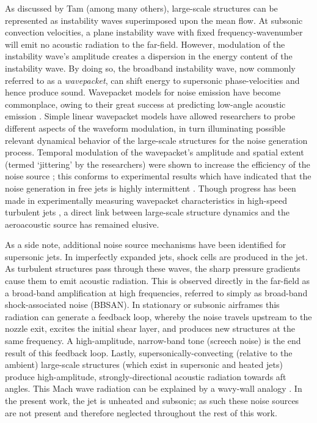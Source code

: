 As discussed by Tam \etal \citep{Tam1995} (among many others), large-scale structures can be represented as instability waves superimposed upon the mean flow.
At subsonic convection velocities, a plane instability wave with fixed frequency-wavenumber will emit no acoustic radiation to the far-field.
However, modulation of the instability wave's amplitude creates a dispersion in the energy content of the instability wave.
By doing so, the broadband instability wave, now commonly referred to as a \emph{wavepacket}, can shift energy to supersonic phase-velocities and hence produce sound.
Wavepacket models for noise emission have become commonplace, owing to their great success at predicting low-angle acoustic emission \citep{Obrist2011}.
Simple linear wavepacket models have allowed researchers to probe different aspects of the waveform modulation, in turn illuminating possible relevant dynamical behavior of the large-scale structures for the noise generation process.
Temporal modulation of the wavepacket's amplitude and spatial extent (termed `jittering' by the researchers) were shown to increase the efficiency of the noise source \citep{Cavalieri2010}; this conforms to experimental results which have indicated that the noise generation in free jets is highly intermittent \citep{Hileman2005,Kearney-Fischer2013}. 
Though progress has been made in experimentally measuring wavepacket characteristics in high-speed turbulent jets \citep{Cavalieri2013,Baqui2014}, a direct link between large-scale structure dynamics and the aeroacoustic source has remained elusive.
 
As a side note, additional noise source mechanisms have been identified for supersonic jets. In imperfectly expanded jets, shock cells are produced in the jet. As turbulent structures pass through these waves, the sharp pressure gradients cause them to emit acoustic radiation. 
This is observed directly in the far-field as a broad-band amplification at high frequencies, referred to simply as broad-band shock-associated noise (BBSAN). 
In stationary or subsonic airframes this radiation can generate a feedback loop, whereby the noise travels upstream to the nozzle exit, excites the initial shear layer, and produces new structures at the same frequency.
A high-amplitude, narrow-band tone (screech noise) is the end result of this feedback loop.
Lastly, supersonically-convecting (relative to the ambient) large-scale structures (which exist in supersonic and heated jets) produce high-amplitude, strongly-directional acoustic radiation towards aft angles.
This Mach wave radiation can be explained by a wavy-wall analogy \citep{Tam1995}.
In the present work, the jet is unheated and subsonic; as such these noise sources are not present and therefore neglected throughout the rest of this work.

 